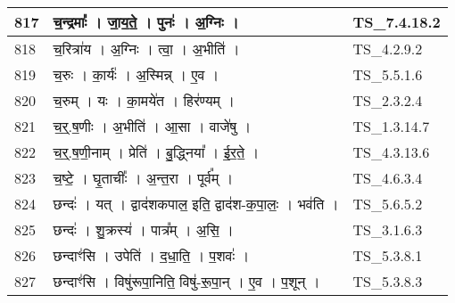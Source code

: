 \documentclass[17pt]{extarticle}
\begin{document}
\begin{longtable}{||p{0.4in}||p{4.9in}||p{0.9in}||}
    \hline
        
    817 & च॒न्द्रमाः᳚   ।   जा॒य॒ते॒   ।   पुनः॑   ।   अ॒ग्निः   ।    & TS\_7.4.18.2       \\
    
    \hline
        
    818 & च॒रित्रा॑य   ।   अ॒ग्निः   ।   त्वा॒   ।   अ॒भीति॑   ।    & TS\_4.2.9.2       \\
    
    \hline
        
    819 & च॒रुः   ।   का॒र्यः॑   ।   अ॒स्मिन्न्   ।   ए॒व   ।    & TS\_5.5.1.6       \\
    
    \hline
        
    820 & च॒रुम्   ।   यः   ।   का॒मये॑त   ।   हिर॑ण्यम्   ।    & TS\_2.3.2.4       \\
    
    \hline
        
    821 & च॒र्॒.ष॒णीः   ।   अ॒भीति॑   ।   आ॒सा   ।   वाजे॑षु   ।    & TS\_1.3.14.7       \\
    
    \hline
        
    822 & च॒र्॒.ष॒णी॒नाम्   ।   प्रेति॑   ।   बु॒द्ध्निया᳚   ।   ई॒र॒ते॒   ।    & TS\_4.3.13.6       \\
    
    \hline
        
    823 & च॒ष्टे॒   ।   घृ॒ताचीः᳚   ।   अ॒न्त॒रा   ।   पूर्व᳚म्   ।    & TS\_4.6.3.4       \\
    
    \hline
        
    824 & छन्दः॑   ।   यत्   ।   द्वाद॑शकपाल॒ इति॒ द्वाद॑श{-}क॒पा॒लः॒   ।   भव॑ति   ।    & TS\_5.6.5.2       \\
    
    \hline
        
    825 & छन्दः॑   ।   शु॒क्रस्य॑   ।   पात्र᳚म्   ।   अ॒सि॒   ।    & TS\_3.1.6.3       \\
    
    \hline
        
    826 & छन्दाꣳ॑सि   ।   उपेति॑   ।   द॒धा॒ति॒   ।   प॒शवः॑   ।    & TS\_5.3.8.1       \\
    
    \hline
        
    827 & छन्दाꣳ॑सि   ।   विषु॑रूपा॒निति॒ विषु॑{-}रू॒पा॒न्   ।   ए॒व   ।   प॒शून्   ।    & TS\_5.3.8.3       \\
    

\end{longtable}
\end{document}
